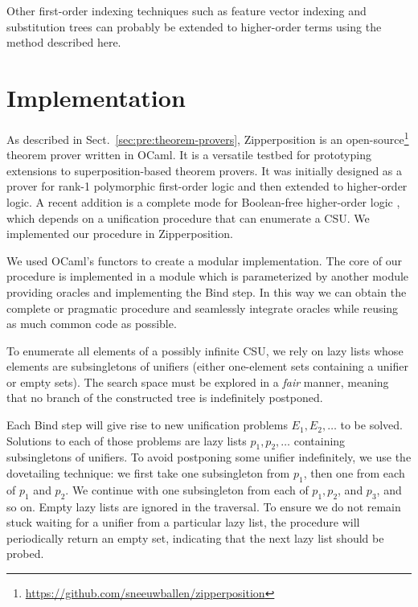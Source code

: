 Other first-order indexing techniques such as feature vector indexing and substitution trees
can probably be extended to higher-order terms using the method described here.
\pagebreak[2]

\section{Implementation}
\label{sec:unif:implementation}
As described in Sect.~\ref{sec:pre:theorem-provers}, Zipperposition \cite{sc-15-simon-phd, sc-supind-17} is an
open-source\footnote{\url{https://github.com/sneeuwballen/zipperposition}}
theorem prover written in OCaml.
It is a versatile testbed for prototyping extensions to
superposition-based theorem provers.
It was initially designed as a prover for rank-1 polymorphic \cite{bp-13-tff1} first-order logic 
and then extended to higher-order logic.
A recent addition is a complete mode for
Boolean-free higher-order logic \cite{bbtvw-21-sup-lam},
which depends on a unification procedure that can enumerate a CSU. 
We implemented our procedure in Zipperposition.

We used OCaml's functors to create a modular implementation. The core of our
procedure is implemented in a module which is parameterized by another module
providing oracles and implementing the \textsf{Bind} step. In this way we can
obtain the complete or pragmatic procedure and seamlessly integrate
oracles while reusing as much common code as possible.

To enumerate all elements of a possibly infinite CSU, we rely on lazy lists whose
elements are subsingletons of unifiers (either one-element sets containing a unifier
or empty sets). The search space must be explored in a {\em fair} manner,
meaning that no branch of the constructed tree is indefinitely postponed. 

Each {\sf Bind} step will give rise to new unification problems $E_1, E_2,
\ldots$ to be solved. Solutions to each of those problems are lazy lists $p_1,
p_2, \ldots$ containing subsingletons of unifiers. To avoid postponing some
unifier indefinitely, we use the dovetailing technique: we first take one
subsingleton from $p_1$, then one from each of $p_1$ and $p_2$. We continue with
one subsingleton from each of $p_1,p_2$, and $p_3$, and so on. Empty lazy lists are
ignored in the traversal. To ensure we do not remain stuck waiting for a unifier
from a particular lazy list, the procedure will periodically return an empty
set, indicating that the next lazy list should be probed. 

